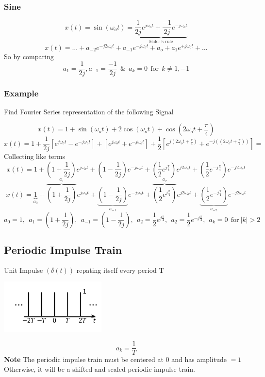 \documentclass[11pt,a4paper]{article}
\theoremstyle{definition}
\begin{document}
\subsubsection{Sine}
\[
    x(t) = \sin(\omega_ot) = \underbrace{\dfrac{1}{2j} e^{j\omega_ot} + \dfrac{-1}{2j} e^{-j\omega_ot}}_{\text{Euler's rule}}
\]
\[
    x(t) = \dots + a_{-2}e^{-j2\omega_ot}
    + a_{-1}e^{-j\omega_ot} + a_o + a_{1}e^{+j\omega_ot} + \dots
\]
So by comparing 
\[
    \boxed{a_1 = \frac{1}{2j},a_{-1} =\frac{-1}{2j}  \ \ \& \ \ a_k = 0  \ \
    \text{for} \ \ k \neq 1, -1 }
\]
\subsubsection{Example}
Find Fourier Series representation of the following Signal 

\[
    x(t) = 1 + \sin(\omega_ot) + 2 \cos(\omega_ot) + \cos(2\omega_ot + \frac{\pi}{4})
\]
\[
    x(t) = 1 + \frac{1}{2j}[e^{j\omega_ot}-e^{-j\omega_ot}] + 
    [e^{j\omega_ot} + e^{-j\omega_ot}] + \frac{1}{2} [e^{j(2\omega_ot+\frac{\pi}{4})} 
    + e^{-j((2\omega_ot+\frac{\pi}{4}))}] = 
\]
Collecting like terms
\[
    x(t) = 1 + (1 + \frac{1}{2j}) e^{j\omega_ot} +(1 - \frac{1}{2j}) e^{-j\omega_ot} 
    + (\frac{1}{2} e^{j\frac{\pi}{4}}) e^{j2\omega_ot} + (\frac{1}{2} e^{-j\frac{\pi}{4}}) e^{-j2\omega_ot}
\]
\[
    x(t) = \underbrace{1}_{a_0} + \overbrace{(1 + \frac{1}{2j})}^{a_1} e^{j\omega_ot} 
    + \underbrace{(1 - \frac{1}{2j})}_{a_{-1}} e^{-j\omega_ot} 
    + \overbrace{(\frac{1}{2} e^{j\frac{\pi}{4}})}^{a_2} e^{j2\omega_ot} +
    \underbrace{(\frac{1}{2} e^{-j\frac{\pi}{4}})}_{a_{-2}} e^{-j2\omega_ot}
\]
\[
    a_0 = 1, \ \ a_1 = (1+\frac{1}{2j}), \ \ a_{-1} = (1-\frac{1}{2j}),  \ \ 
    a_2 = \frac{1}{2} e^{j\frac{\pi}{4}}, \ \ a_2 = \frac{1}{2} e^{-j\frac{\pi}{4}},
    \ \ a_k = 0 \ \ \text{for} \ |k| > 2 
\]
\subsection{Periodic Impulse Train}
Unit Impulse $(\delta(t))$ repating itself every period T 
\begin{center}
    \includegraphics[width=201px]{impulse-train.png}

\end{center}
\[
    \boxed{a_k = \frac{1}{T}}
\]
\textbf{Note} The periodic impulse train must be centered at 0 and has amplitude $=1$
Otherwise, it will be a shifted and scaled periodic impulse train.
\end{document}
